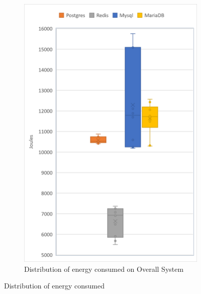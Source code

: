 \begin{figure}[h]
\begin{subfigure}[b]{0.325\textwidth}
			\includegraphics[width=1\columnwidth]{results/boxplot/Total.png}
            \caption[Distribution of energy consumed on Overall System]%
            {{\small Distribution of energy consumed on Overall System}}    
            \label{fig:bocplotyenergytotal}
        \end{subfigure}
        \caption[ Distribution of energy consumed ]
        {\small Distribution of energy consumed} 
        \label{fig:bocplotyenergy}
    \end{figure}